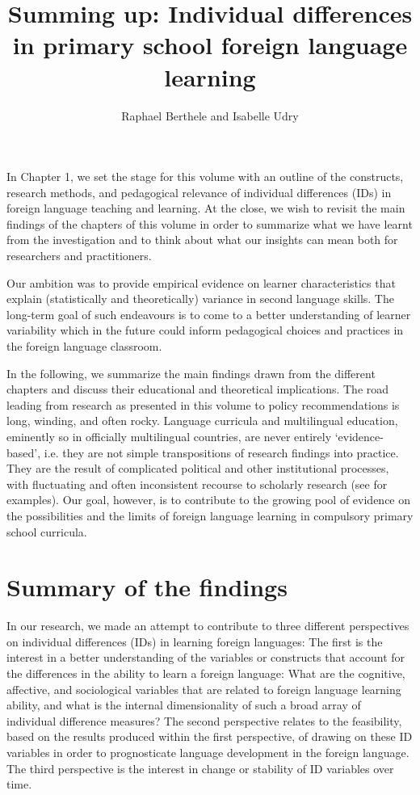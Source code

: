 \documentclass[output=paper]{langsci/langscibook}
\author{Raphael Berthele\orcid{}\affiliation{University of Fribourg, Institut de Plurilinguisme} and Isabelle Udry\orcid{}\affiliation{University of Fribourg, Institut de Plurilinguisme; Zurich University of Teacher Education}}
\title[Summing up]
      {Summing up: Individual differences in primary school foreign language learning}
\begin{document}
\maketitle 

In Chapter 1, we set the stage for this volume with an outline of the constructs, research methods, and pedagogical relevance of individual differences (IDs) in foreign language teaching and learning. At the close, we wish to revisit the main findings of the chapters of this volume in order to summarize what we have learnt from the investigation and to think about what our insights can mean both for researchers and practitioners.

Our ambition was to provide empirical evidence on learner characteristics that explain (statistically and theoretically) variance in second language skills. The long-term goal of such endeavours is to come to a better understanding of learner variability which in the future could inform pedagogical choices and practices in the foreign language classroom.

In the following, we summarize the main findings drawn from the different chapters and discuss their educational and theoretical implications. The road leading from research as presented in this volume to policy recommendations is long, winding, and often rocky. Language curricula and multilingual education, eminently so in officially multilingual countries, are never entirely ‘evidence-based’, i.e. they are not simple transpositions of research findings into practice. They are the result of complicated political and other institutional processes, with fluctuating and often inconsistent recourse to scholarly research (see \citealt{Berthele2018} for examples). Our goal, however, is to contribute to the growing pool of evidence on the possibilities and the limits of foreign language learning in compulsory primary school curricula.

\section{Summary of the findings}

In our research, we made an attempt to contribute to three different perspectives on individual differences (IDs) in learning foreign languages: The first is the interest in a better understanding of the variables or constructs that account for the differences in the ability to learn a foreign language: What are the cognitive, affective, and sociological variables that are related to foreign language learning ability, and what is the internal dimensionality of such a broad array of individual difference measures? The second perspective relates to the feasibility, based on the results produced within the first perspective, of drawing on these ID variables in order to prognosticate language development in the foreign language. The third perspective is the interest in change or stability of ID variables over time.
\end{document}
